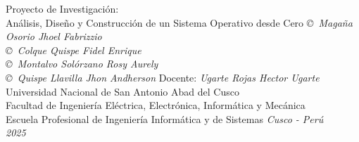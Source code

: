 \documentclass[letterpaper,12pt]{report}
\begin{document}

\thesistitle
{Proyecto de Investigación: \\
	Análisis, Diseño y Construcción de un Sistema Operativo desde Cero}
{\emph{\copyright\ Magaña Osorio Jhoel Fabrizzio}\\
	\emph{\copyright\ Colque Quispe Fidel Enrique}\\
	\emph{\copyright\ Montalvo Sol\'orzano Rosy Aurely}\\
	\emph{\copyright\ Quispe Llavilla Jhon Andherson}}
{Docente: \emph{Ugarte Rojas Hector Ugarte}}
{Universidad Nacional de San Antonio Abad del Cusco\\
	Facultad de Ingeniería Eléctrica, Electrónica, Informática y Mecánica \\
	Escuela Profesional de Ingeniería Informática y de Sistemas}
{\emph{Cusco - Perú\\2025}}

























\end{document}
